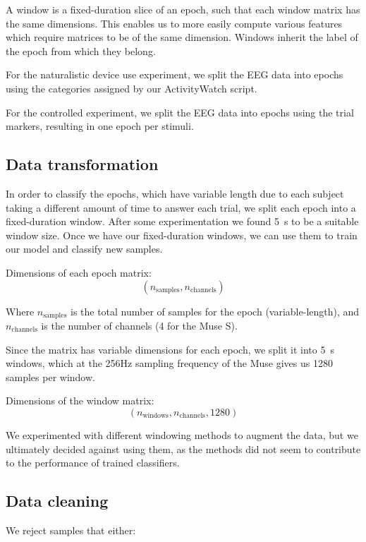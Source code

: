         A window is a fixed-duration slice of an epoch, such that each window matrix has the same dimensions. This enables us to more easily compute various features which require matrices to be of the same dimension. Windows inherit the label of the epoch from which they belong.

        For the naturalistic device use experiment, we split the EEG data into epochs using the categories assigned by our ActivityWatch script.

        For the controlled experiment, we split the EEG data into epochs using the trial markers, resulting in one epoch per stimuli.

    \subsection{Data transformation}\label{section:transform}

        In order to classify the epochs, which have variable length due to each subject taking a different amount of time to answer each trial, we split each epoch into a fixed-duration window. After some experimentation we found \SI{5}{\second} to be a suitable window size. Once we have our fixed-duration windows, we can use them to train our model and classify new samples.

        Dimensions of each epoch matrix: \[ (n_{\mathrm{samples}}, n_{\mathrm{channels}}) \]

        Where $n_{\mathrm{samples}}$ is the total number of samples for the epoch (variable-length), and $n_{\mathrm{channels}}$ is the number of channels (4 for the Muse S).

        Since the matrix has variable dimensions for each epoch, we split it into \SI{5}{\second} windows, which at the 256Hz sampling frequency of the Muse gives us 1280 samples per window.

        Dimensions of the window matrix: \[ (n_{\mathrm{windows}}, n_{\mathrm{channels}}, 1280) \]

        We experimented with different windowing methods to augment the data, but we ultimately decided against using them, as the methods did not seem to contribute to the performance of trained classifiers.

    \subsection{Data cleaning}

        We reject samples that either:

